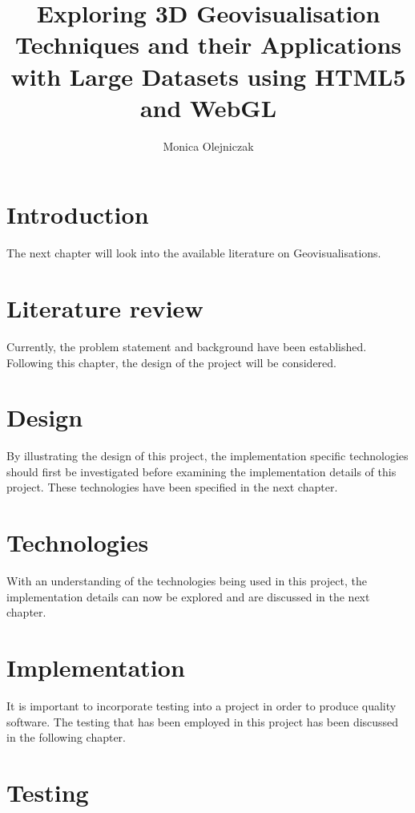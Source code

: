 \documentclass[
	paper=A4,
    titlepage=true,
	fontsize=11pt,
	parskip=half
]{scrreprt}
\title{Exploring 3D Geovisualisation Techniques and their Applications with Large Datasets using HTML5 and WebGL}
\author{Monica Olejniczak}
\begin{document}
	
	
	\chapter{Introduction} {
	\label{ch:introduction}
		
	}

	The next chapter will look into the available literature on Geovisualisations.

	\chapter{Literature review} {
	\label{ch:literature_review}
		
	}

	Currently, the problem statement and background have been established. Following this chapter, the design of the project will be considered.
	
	\chapter{Design} {
	\label{ch:design}
		
	}

	By illustrating the design of this project, the implementation specific technologies should first be investigated before examining the implementation details of this project. These technologies have been specified in the next chapter.

	\chapter{Technologies} {
	\label{ch:technologies}
		
	}

	With an understanding of the technologies being used in this project, the implementation details can now be explored and are discussed in the next chapter.
	
	\chapter{Implementation} {
	\label{ch:implementation}
		
	}

	It is important to incorporate testing into a project in order to produce quality software. The testing that has been employed in this project has been discussed in the following chapter.

	\chapter{Testing} {
	\label{ch:testing}
		
	}
\end{document}
